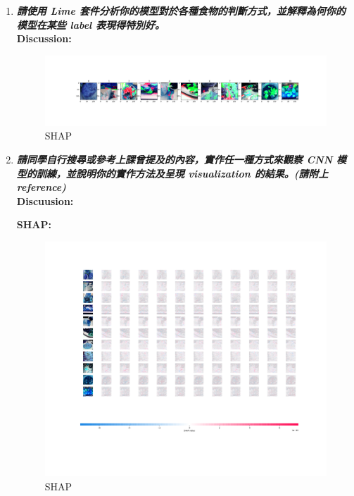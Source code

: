 \documentclass[a4paper,11pt]{article}
\begin{document}
\begin{enumerate}
\newpage

	\item \textit{\textbf{請使用 Lime 套件分析你的模型對於各種食物的判斷方式，並解釋為何你的模型在某些 label 表現得特別好。}}\\

	\textbf{Discussion:}

		\begin{figure}[htp]
		    \begin{center}
		    		\includegraphics[scale=0.3]{./lime.png}
		    	\caption{SHAP}
		    \end{center}
		\end{figure}
	
	\item \textit{\textbf{請同學自行搜尋或參考上課曾提及的內容，實作任一種方式來觀察 CNN 模型的訓練，並說明你的實作方法及呈現 visualization 的結果。(請附上 reference)}}\\

	\textbf{Discuusion:}\\

\newpage

	\textbf{SHAP:}\\

		\begin{figure}[htp]
		    \begin{center}
		    		\includegraphics[scale=0.3]{./shap_results.png}
		    	\caption{SHAP}
		    \end{center}
		\end{figure}

\end{enumerate}
\end{document}
